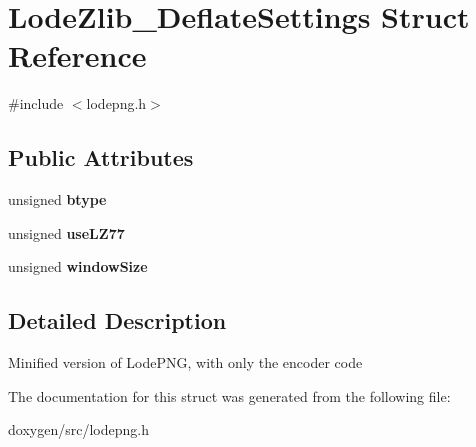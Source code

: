 \hypertarget{struct_lode_zlib___deflate_settings}{}\section{Lode\+Zlib\+\_\+\+Deflate\+Settings Struct Reference}
\label{struct_lode_zlib___deflate_settings}


{\ttfamily \#include $<$lodepng.\+h$>$}

\subsection*{Public Attributes}
\begin{DoxyCompactItemize}
\item 
\mbox{\label{struct_lode_zlib___deflate_settings_a9a016a3b62b8efae335eb585f7f40cfd}} 
unsigned {\bfseries btype}
\item 
\mbox{\label{struct_lode_zlib___deflate_settings_a71f933aad07b4d940716c7873c771c95}} 
unsigned {\bfseries use\+L\+Z77}
\item 
\mbox{\label{struct_lode_zlib___deflate_settings_ab4db0ff77376a9a8b9af7f85cafc6028}} 
unsigned {\bfseries window\+Size}
\end{DoxyCompactItemize}


\subsection{Detailed Description}
Minified version of Lode\+P\+NG, with only the encoder code 

The documentation for this struct was generated from the following file\+:\begin{DoxyCompactItemize}
\item 
doxygen/src/lodepng.\+h\end{DoxyCompactItemize}
